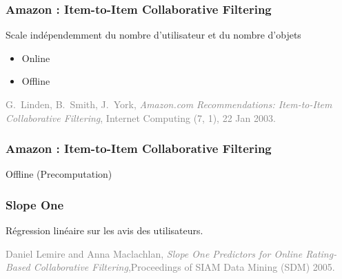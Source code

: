 \documentclass[t]{beamer}
\newcommand\gray[1]{\textcolor{gray}{#1}}
\begin{document}
\begin{frame}
  \frametitle{Amazon : Item-to-Item Collaborative Filtering}

  Scale indépendemment du nombre d'utilisateur et du nombre d'objets
  \begin{itemize}
  \item Online
  \item Offline
  \end{itemize}

  \bigskip
  \gray{G.~Linden, B.~Smith, J.~York, \textit{Amazon.com
      Recommendations: Item-to-Item Collaborative Filtering}, Internet
  Computing (7, 1), 22 Jan 2003.}

\end{frame}

\begin{frame}
  \frametitle{Amazon : Item-to-Item Collaborative Filtering}
  Offline (Precomputation)

  \DontPrintSemicolon
  \begin{algorithm}[H]
  \end{algorithm}
\end{frame}



\begin{frame}
  \frametitle{Slope One}

  \vspace{1cm}
  Régression linéaire sur les avis des utilisateurs.
  \vspace{1cm}
  
  \gray{Daniel Lemire and Anna Maclachlan, \textit{Slope One
      Predictors for Online Rating-Based Collaborative
      Filtering},Proceedings of SIAM Data Mining (SDM) 2005.}
\end{frame}
\end{document}
